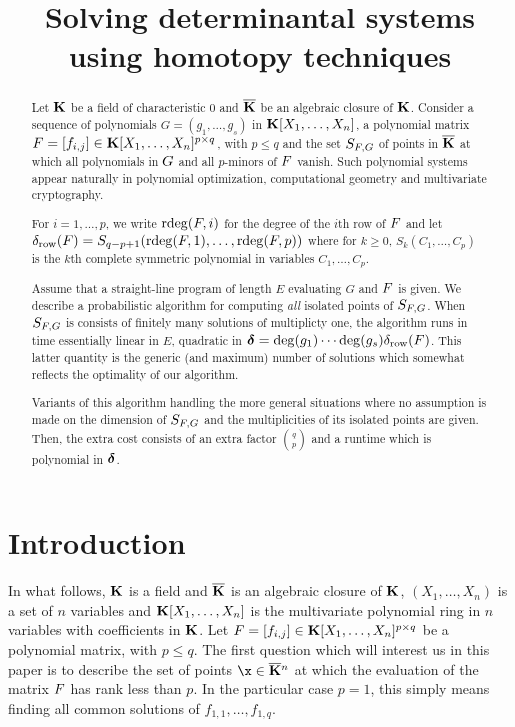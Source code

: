\documentclass[12pt]{article}
\title{Solving determinantal systems using homotopy techniques}
\begin{document}
\maketitle

\begin{abstract}
  Let $\mathbf{K}$ be a field of characteristic $0$ and $\overline{\mathbf{K}}$ be an
  algebraic closure of $\mathbf{K}$. Consider a sequence of polynomials
  $G=(g_1,\dots,g_s)$ in $\mathbf{K}[X_1,\dots,X_n]$, a polynomial matrix
  ${F}=[f_{i,j}] \in \mathbf{K}[X_1,\dots,X_n]^{p \times q}$, with $p \leq q$
  and the set $S_{{F}, G}$ of points in $\overline{\mathbf{K}}$ at which all
  polynomials in ${G}$ and all $p$-minors of ${F}$ vanish. Such
  polynomial systems appear naturally in polynomial optimization,
  computational geometry and multivariate cryptography.

  For $i=1,\dots,p$, we write $\mathrm{rdeg}({F},i)$ for the degree of the
  $i$th row of ${F}$ and let
  $\delta_{\rm row}({F}) = S_{q-p+1}(\mathrm{rdeg}({F},1), \ldots,
  \mathrm{rdeg}({F},p))$
  where for $k\ge 0$, $S_k(C_1,\dots,C_p)$ is the $k$th complete
  symmetric polynomial in variables $C_1,\dots,C_p$.

  Assume that a straight-line program of length $E$ evaluating $G$ and
  ${F}$ is given.  We describe a probabilistic algorithm for computing
  \emph{all} isolated points of $S_{{F}, G}$. When $S_{{F}, G}$ is
  consists of finitely many solutions of multiplicty one, the
  algorithm runs in time essentially linear in $E$, quadratic in
  $\mbox{\boldmath$\delta$}= \deg(g_1)\cdots \deg(g_s)\delta_{{\rm row}}({F})$.  This
  latter quantity is the generic (and maximum) number of solutions
  which somewhat reflects the optimality of our algorithm.

  Variants of this algorithm handling the more general situations
  where no assumption is made on the dimension of $S_{{F}, G}$ and the
  multiplicities of its isolated points are given. Then, the extra
  cost consists of an extra factor ${{q}\choose{p}}$ and a runtime
  which is polynomial in $\mbox{\boldmath$\delta$}$.
\end{abstract}

\section{Introduction}\label{sec:intro}

In what follows, $\mathbf{K}$ is a field and $\overline{\mathbf{K}}$ is an algebraic closure
of $\mathbf{K}$, $(X_1, \ldots, X_n)$ is a set of $n$ variables and
$\mathbf{K}[X_1,\dots,X_n]$ is the multivariate polynomial ring in $n$
variables with coefficients in $\mathbf{K}$. Let ${F}=[f_{i,j}] \in
\mathbf{K}[X_1,\dots,X_n]^{p \times q}$ be a polynomial matrix, with $p \leq
q$. The first question which will interest us in this paper is to
describe the set of points $\x \in \KKbar{}^n$ at which the evaluation
of the matrix ${F}$ has rank less than $p$.  In the particular case
$p=1$, this simply means finding all common solutions of
$f_{1,1},\dots,f_{1,q}$.
\end{document}
